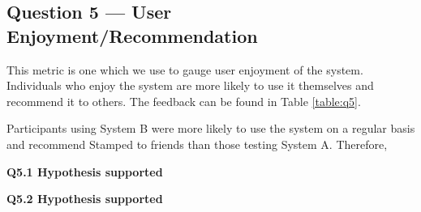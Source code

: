 \subsection{Question 5 --- User Enjoyment/Recommendation}
This metric is one which we use to gauge user enjoyment of the system. Individuals who enjoy the system are more likely to use it themselves and recommend it to others. The feedback can be found in Table \ref{table:q5}.
    \begin{table}[H]
    \caption{Table showing answers to question 5 from the study}
    \label{table:q5}
    \end{table}
    \newpage
   	Participants using System B were more likely to use the system on a regular basis and recommend Stamped to friends than those testing System A. Therefore,

	\textbf{Q5.1 Hypothesis supported}

	\textbf{Q5.2 Hypothesis supported }

